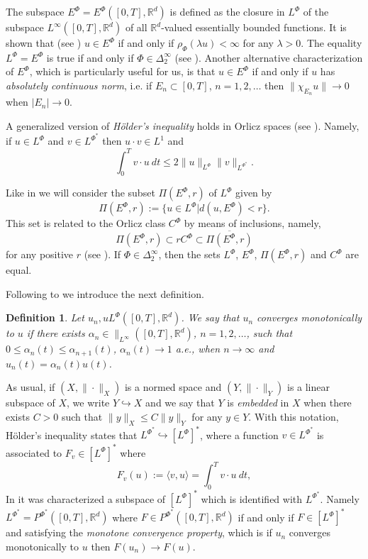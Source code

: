 \documentclass[twoside]{article}
\newtheorem{defi}[thm]{Definition}
\theoremstyle{remark}
\newcommand{\orlnor}{\|_{L^{\Phi}}}
\newcommand{\linf}{\|_{L^{\infty}}}
\newcommand{\lphi}{L^{\Phi}}
\newcommand{\lpsi}{L^{\Phi^*}}
\newcommand{\ephi}{E^{\Phi}}
\newcommand{\claseor}{C^{\Phi}}
\newcommand{\rr}{\mathbb{R}}
\renewcommand{\leq}{\leqslant}
\newcommand{\Phie}{\Phi^{*}}
\begin{document}
The subspace $\ephi=\ephi([0,T],\rr^d)$ is defined as the closure in $\lphi$ of the subspace $L^{\infty}([0,T],\rr^d)$ of all $\mathbb{R}^d$-valued essentially bounded functions. It is shown that  (see \cite[Thm. 5.1]{Orliczvectorial2005}) $u\in\ephi$  if and only if $\rho_{\Phi}(\lambda u)<\infty$ for any $\lambda>0$. The equality $\lphi=\ephi$ is true if and only if $\Phi\in\Delta_2^{\infty}$ (see \cite[Thm. 5.2]{Orliczvectorial2005}). Another alternative characterization of $\ephi$, which is particularly useful for us, is that $u\in\ephi$ if and only if $u$ has  \emph{absolutely continuous norm}, i.e.   if $E_n\subset [0,T]$, $n=1,2,\ldots$ then $\|\chi_{E_n}u\|\to 0$ when $|E_n|\to 0$.

A generalized version of \emph{H\"older's inequality} holds in Orlicz spaces (see \cite[Thm. 4.1]{Skaff1969}). Namely, if $u\in\lphi$ and $v\in\lpsi$ then $u\cdot v\in L^1$ and
\begin{equation}\label{holder}
\int_0^Tv\cdot u\ dt\leq 2 \|u\orlnor\|v\|_{L^{\Phie}}.
\end{equation}


Like in \cite{KR} we will consider the subset $\Pi(\ephi,r)$ of $\lphi$ given by
\[\Pi(\ephi,r):=\{u\in\lphi| d(u,\ephi)<r\}.\]
This set is related to the Orlicz class $\claseor$ by means of inclusions, namely,
\begin{equation}\label{inclusiones}\Pi(\ephi, r )\subset r \claseor\subset\overline{\Pi(\ephi,r)}
\end{equation}
for any positive $r$ (see \cite[Thm. 5.6]{Orliczvectorial2005}).
If $\Phi \in \Delta_2^{\infty}$,  then the sets $\lphi$, $\ephi$, $\Pi(\ephi,r)$ and $\claseor$ are equal.

Following to \cite{Desch2001} we introduce the next definition.

\begin{defi} Let $u_n,u\lphi([0,T],\rr^d)$. We say that $u_n$ converges monotonically to $u$ if there exists $\alpha_n\in\linf([0,T],\rr^d)$, $n=1,2,\ldots$, such that $0\leq \alpha_n(t)\leq \alpha_{n+1}(t)$, $\alpha_n(t)\to 1$ a.e., when $n\to\infty$ and $u_n(t)=\alpha_n(t)u(t)$.

\end{defi}

 
As usual, if $(X,\|\cdot\|_X)$ is a normed space and $(Y,\|\cdot \|_Y)$ is a linear subspace of $X$,  we write $Y\hookrightarrow X$ and we say that $Y$ is \emph{embedded} in $X$  when there exists $C>0$ such that
$\|y\|_X\leq C\|y\|_Y$ for any $y\in Y$.  With this notation, H\"older's inequality states that  $\lpsi\hookrightarrow  \left[\lphi\right]^*$, where a function $v\in\lpsi$ is associated  to $F_v\in \left[\lphi\right]^*$ where
\begin{equation}\label{pairing}
  F_v(u):=\langle v,u\rangle=\int_0^Tv\cdot u\ dt,
\end{equation}
 In  \cite[Thm 2.9]{Desch2001}  it was characterized a subspace of   $\left[\lphi\right]^*$ which is identified with $\lpsi$. Namely $\lpsi=P^{\Phie}([0,T],\rr^d)$ where $F\in P^{\Phie}([0,T],\rr^d)$ if and only if $F\in\left[\lphi\right]^*$ and satisfying the \emph{monotone convergence property}, which is if $u_n$ converges monotonically to $u$ then $F(u_n)\to F(u)$.
\end{document}
